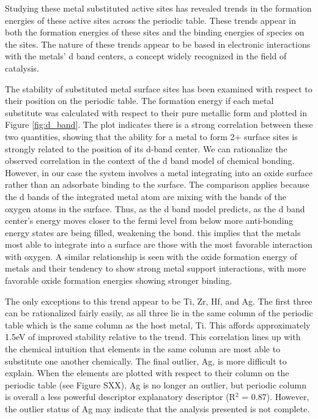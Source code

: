 \documentclass[catalysts,article,submit,moreauthors,pdftex,10pt,a4paper]{mdpi}
\theoremstyle{mdpi}
\newcounter{ex}
\newcounter{re}
\theoremstyle{mdpidefinition}
\begin{document}
Studying these metal substituted active sites has revealed trends in the formation energies of these active sites across the periodic table. These trends appear in both the formation energies of these sites and the binding energies of species on the sites. The nature of these trends appear to be based in electronic interactions with the metals' d band centers, a concept widely recognized in the field of catalysis\cite{Hammer_2000}.

The stability of substituted metal surface sites has been examined with respect to their position on the periodic table. The formation energy if each metal substitute was calculated with respect to their pure metallic form and plotted in Figure \ref{fig:d_band}. The plot indicates there is a strong correlation between these two quantities, showing that the ability for a metal to form 2+ surface sites is strongly related to the position of its d-band center. We can rationalize the observed correlation in the context of the d band model of chemical bonding\cite{Nilsson_2008}. However, in our case the system involves a metal integrating into an oxide surface rather than an adsorbate binding to the surface. The comparison applies because the d bands of the integrated metal atom are mixing with the bands of the oxygen atoms in the surface. Thus, as the d band model predicts, as the d band center's energy moves closer to the fermi level from below more anti-bonding energy states are being filled, weakening the bond. this implies that the metals most able to integrate into a surface are those with the most favorable interaction with oxygen. A similar relationship is seen with the oxide formation energy of metals and their tendency to show strong metal support interactions\cite{O_Connor_2018}, with more favorable oxide formation energies showing stronger binding.

The only exceptions to this trend appear to be Ti, Zr, Hf, and Ag. The first three can be rationalized fairly easily, as all three lie in the same column of the periodic table which is the same column as the host metal, Ti. This affords approximately 1.5eV of improved stability relative to the trend. This correlation lines up with the chemical intuition that elements in the same column are most able to substitute one another chemically. The final outlier, Ag, is more difficult to explain. When the elements are plotted with respect to their column on the periodic table (see Figure SXX), Ag is no longer an outlier, but periodic column is overall a less powerful descriptor explanatory descriptor (R$^2$ = 0.87). However, the outlier status of Ag may indicate that the analysis presented is not complete.
\end{document}
